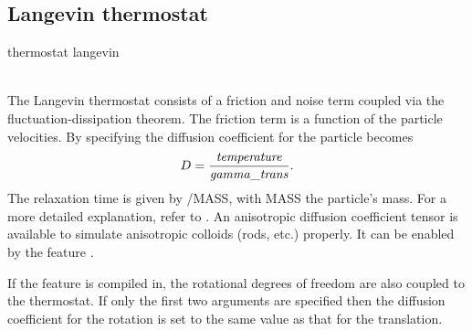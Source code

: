 \subsection{Langevin thermostat}

\begin{pysyntax}
\end{pysyntax}

\begin{essyntax}
  thermostat langevin   \\
  \asep {}   \\
    
\end{essyntax}


The Langevin thermostat consists of a friction and noise term coupled
via the fluctuation-dissipation theorem. The friction term is a
function of the particle velocities. By specifying  the diffusion coefficient for the particle becomes
\begin{equation}
D = \frac{\mathrm{\mathit{temperature}}}{\mathrm{\mathit{gamma\_trans}}}.
\end{equation}
The relaxation time is given by /MASS, with MASS the particle's mass. For a more detailed explanation,
refer to \cite{grest86a}. An anisotropic diffusion coefficient tensor is available to simulate anisotropic colloids (rods, etc.) properly.
It can be enabled by the feature .

If the feature  is compiled in, the rotational
degrees of freedom are also coupled to the thermostat. If only the first two arguments are specified then the diffusion coefficient for the rotation is set to the same value as that for the translation.


